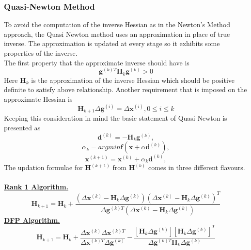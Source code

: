 \documentclass[12pt,a4paper,titlepage]{article}
\begin{document}
\subsubsection{Quasi-Newton Method}
To avoid the computation of the inverse Hessian as in the Newton's Method approach, the Quasi Newton method uses an approximation in place of true inverse. The approximation is updated at every stage so it exhibits some properties of the inverse.\\ The first property that the approximate inverse should have is 
\begin{equation}
    \textbf{g}^{(k)T}\textbf{H}_{k}\textbf{g}^{(k)} >0
\end{equation}
Here $\textbf{H}_{k}$ is the approximation of the inverse Hessian which should be positive definite to satisfy above relationship. Another requirement that is imposed on the approximate Hessian is 
\begin{equation}
    \textbf{H}_{k+1}\Delta \textbf{g}^{(i)}= \Delta \textbf{x}^{(i)}, 0 \leq i \leq k
\end{equation}
Keeping this consideration in mind the basic statement of Quasi Newton is presented as 
\begin{equation}
    \textbf{d}^{(k)}= - \textbf{H}_{k}\textbf{g}^{(k)},
\end{equation}
\begin{equation}
    \alpha_{k}= argmin \textbf{f}(\textbf{x}+\alpha \textbf{d}^{(k)}),
\end{equation}
\begin{equation}
    \textbf{x}^{(k+1)}= \textbf{x}^{(k)}+\alpha_{k}\textbf{d}^{(k)},
\end{equation}
The updation formulae for $\textbf{H}^{(k+1)}$ from $\textbf{H}^{(k)}$ comes in three different flavours. \\
\\ \textbf{\underline{Rank 1 Algorithm.}}
\begin{equation}
    \textbf{H}_{k+1}= \textbf{H}_{k}+ \frac{(\Delta \textbf{x}^{(k)}-\textbf{H}_{k}\Delta\textbf{g}^{(k)})(\Delta \textbf{x}^{(k)}-\textbf{H}_{k}\Delta\textbf{g}^{(k)})^T}{\Delta \textbf{g}^{(k)T}(\Delta \textbf{x}^{(k)}-\textbf{H}_{k}\Delta\textbf{g}^{(k)})}
\end{equation}
\textbf{\underline{DFP Algorithm.}}
\begin{equation}
        \textbf{H}_{k+1}= \textbf{H}_{k}+\frac{\Delta\textbf{x}^{(k)}\Delta\textbf{x}^{(k)T}}{\Delta\textbf{x}^{(k)T}\Delta\textbf{g}^{(k)}}-\frac{[\textbf{H}_{k}\Delta\textbf{g}^{(k)}][\textbf{H}_{k}\Delta\textbf{g}^{(k)}]^{T}}{\Delta \textbf{g}^{(k)T}\textbf{H}_{k}\Delta\textbf{g}^{(k)}}
\end{equation}
\end{document}
